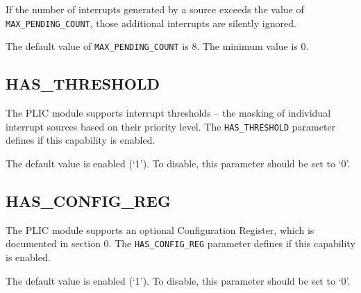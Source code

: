 If the number of interrupts generated by a source exceeds the value of \texttt{MAX\_PENDING\_COUNT}, those additional interrupts are silently ignored.

The default value of \texttt{MAX\_PENDING\_COUNT} is 8. The minimum value is 0.

\subsection{HAS\_THRESHOLD}

The PLIC module supports interrupt thresholds -- the masking of individual interrupt sources based on their priority level.
The \texttt{HAS\_THRESHOLD} parameter defines if this capability is enabled.

The default value is enabled (`1'). To disable, this parameter should be set to `0'.

\subsection{HAS\_CONFIG\_REG}

The PLIC module supports an optional Configuration Register, which is documented in section 0.
The \texttt{HAS\_CONFIG\_REG} parameter defines if this capability is enabled.

The default value is enabled (`1'). To disable, this parameter should be set to `0'.

